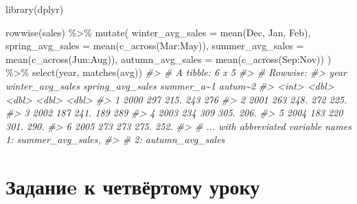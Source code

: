 \documentclass[
]{book}
\newenvironment{Shaded}{\begin{snugshade}}{\end{snugshade}}
\newcommand{\AttributeTok}[1]{\textcolor[rgb]{0.77,0.63,0.00}{#1}}
\newcommand{\CommentTok}[1]{\textcolor[rgb]{0.56,0.35,0.01}{\textit{#1}}}
\newcommand{\FunctionTok}[1]{\textcolor[rgb]{0.00,0.00,0.00}{#1}}
\newcommand{\NormalTok}[1]{#1}
\newcommand{\SpecialCharTok}[1]{\textcolor[rgb]{0.00,0.00,0.00}{#1}}
\newcommand{\StringTok}[1]{\textcolor[rgb]{0.31,0.60,0.02}{#1}}
\begin{document}
\begin{Shaded}
\begin{Highlighting}[]
\FunctionTok{library}\NormalTok{(dplyr)}

\FunctionTok{rowwise}\NormalTok{(sales) }\SpecialCharTok{\%\textgreater{}\%} 
  \FunctionTok{mutate}\NormalTok{(}
    \AttributeTok{winter\_avg\_sales =} \FunctionTok{mean}\NormalTok{(Dec, Jan, Feb),}
    \AttributeTok{spring\_avg\_sales =} \FunctionTok{mean}\NormalTok{(}\FunctionTok{c\_across}\NormalTok{(Mar}\SpecialCharTok{:}\NormalTok{May)),}
    \AttributeTok{summer\_avg\_sales =} \FunctionTok{mean}\NormalTok{(}\FunctionTok{c\_across}\NormalTok{(Jun}\SpecialCharTok{:}\NormalTok{Aug)),}
    \AttributeTok{autumn\_avg\_sales =} \FunctionTok{mean}\NormalTok{(}\FunctionTok{c\_across}\NormalTok{(Sep}\SpecialCharTok{:}\NormalTok{Nov))}
\NormalTok{  ) }\SpecialCharTok{\%\textgreater{}\%} 
  \FunctionTok{select}\NormalTok{(year, }\FunctionTok{matches}\NormalTok{(}\StringTok{\textquotesingle{}avg\textquotesingle{}}\NormalTok{))}
\CommentTok{\#\textgreater{} \# A tibble: 6 x 5}
\CommentTok{\#\textgreater{} \# Rowwise: }
\CommentTok{\#\textgreater{}    year winter\_avg\_sales spring\_avg\_sales summer\_a\textasciitilde{}1 autum\textasciitilde{}2}
\CommentTok{\#\textgreater{}   \textless{}int\textgreater{}            \textless{}dbl\textgreater{}            \textless{}dbl\textgreater{}      \textless{}dbl\textgreater{}   \textless{}dbl\textgreater{}}
\CommentTok{\#\textgreater{} 1  2000              297             215.       243     276 }
\CommentTok{\#\textgreater{} 2  2001              263             248.       272     225.}
\CommentTok{\#\textgreater{} 3  2002              187             241.       189     289 }
\CommentTok{\#\textgreater{} 4  2003              234             309        305.    206.}
\CommentTok{\#\textgreater{} 5  2004              183             220        301.    290.}
\CommentTok{\#\textgreater{} 6  2005              273             273        275.    252.}
\CommentTok{\#\textgreater{} \# ... with abbreviated variable names 1: summer\_avg\_sales,}
\CommentTok{\#\textgreater{} \#   2: autumn\_avg\_sales}
\end{Highlighting}
\end{Shaded}

\hypertarget{ux437ux430ux434ux430ux43dux438e-ux43a-ux447ux435ux442ux432ux451ux440ux442ux43eux43cux443-ux443ux440ux43eux43aux443}{%
\section*{Заданиe к четвёртому уроку}\label{ux437ux430ux434ux430ux43dux438e-ux43a-ux447ux435ux442ux432ux451ux440ux442ux43eux43cux443-ux443ux440ux43eux43aux443}}
\end{document}

